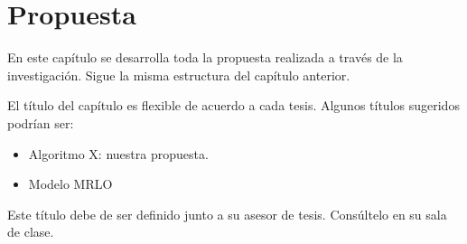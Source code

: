\chapter{Propuesta}\label{chap:proposal}

En este capítulo se desarrolla toda la propuesta realizada a través de la investigación. Sigue la misma estructura del capítulo anterior.

El título del capítulo es flexible de acuerdo a cada tesis. Algunos títulos sugeridos podrían ser:

\begin{itemize}
\item Algoritmo X: nuestra propuesta.
\item Modelo MRLO
\end{itemize}

Este título debe de ser definido junto a su asesor de tesis. Consúltelo en su sala de clase.
